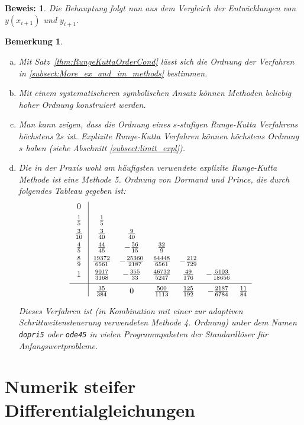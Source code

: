 \documentclass[12pt,a4paper]{book}
\theoremstyle{break}
\newtheorem{bemerkung}[theorem]{Bemerkung}
\theoremstyle{nonumberplain}
\newtheorem{beweis}{Beweis:}
\newcommand{\1}{\mathbbm{1}} 			      	%
\begin{document}
\begin{beweis}
Die Behauptung folgt nun aus dem Vergleich der Entwicklungen von $y(x_{i+1})$ und $y_{i+1}$.
\end{beweis}

\begin{bemerkung}\label{remark:after_ordercond}
\begin{enumerate}[(a)]
\item Mit Satz~\ref{thm:RungeKuttaOrderCond} lässt sich die Ordnung der Verfahren in \ref{subsect:More_ex_and_im_methods} bestimmen.
\item Mit einem systematischeren \emph{symbolischen} Ansatz können Methoden beliebig hoher Ordnung konstruiert werden.
\item Man kann zeigen, dass die Ordnung eines $s$-stufigen Runge-Kutta Verfahrens höchstens $2s$ ist. Explizite Runge-Kutta
Verfahren können höchstens Ordnung $s$ haben (siehe Abschnitt \ref{subsect:limit_expl}).
\item Die in der Praxis wohl am häufigsten verwendete explizite Runge-Kutta Methode ist eine Methode 5. Ordnung von \emph{Dormand und Prince},
die durch folgendes Tableau gegeben ist:
\[
%
\begin{array}{c | c c c c c c}
0\\[+1ex]
\frac{1}{5} & \frac{1}{5}\\[+1ex]
\frac{3}{10} & \frac{3}{40} & \frac{9}{40}\\[+1ex]
\frac{4}{5} & \frac{44}{45} & -\frac{56}{15} & \frac{32}{9}\\[+1ex]
\frac{8}{9} & \frac{19372}{6561} & -\frac{25360}{2187} & \frac{64448}{6561} & -\frac{212}{729}\\[+1ex]
1 & \frac{9017}{3168} & -\frac{355}{33} & \frac{46732}{5247} & \frac{49}{176} & -\frac{5103}{18656}\\[+1ex] \hline 
\phantom{\frac{3}{3}^{\frac{3}{3}}}
& \frac{35}{384} & 0 & \frac{500}{1113} & \frac{125}{192} & -\frac{2187}{6784} & \frac{11}{84}
\end{array}
\]

Dieses Verfahren ist (in Kombination mit einer zur adaptiven Schrittweitensteuerung verwendeten Methode 4. Ordnung) unter dem Namen \texttt{dopri5} oder \texttt{ode45} in vielen Programmpaketen der Standardlöser für Anfangswertprobleme.
\end{enumerate}
\end{bemerkung}




\section{Numerik steifer Differentialgleichungen}\label{sect:steif}
\end{document}
